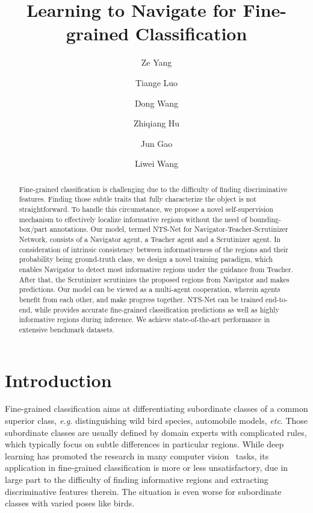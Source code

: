 \documentclass[runningheads]{llncs}
\begin{document}
\title{Learning to Navigate for Fine-grained Classification} 

\author{Ze Yang \and
Tiange Luo \and
Dong Wang \and
Zhiqiang Hu \and
Jun Gao \and
Liwei Wang}

\maketitle              \begin{abstract}
Fine-grained classification is challenging due to the difficulty of finding discriminative features. Finding those subtle traits that fully characterize the object is not straightforward. To handle this circumstance, we propose a novel self-supervision mechanism to effectively localize informative regions without the need of bounding-box/part annotations.  Our model, termed NTS-Net for Navigator-Teacher-Scrutinizer Network, consists of a Navigator agent, a Teacher agent and a Scrutinizer agent. In consideration of intrinsic consistency between informativeness of the regions and their probability being ground-truth class, we design a novel training paradigm,  which enables Navigator to detect most informative regions under the guidance from Teacher. After that, the Scrutinizer scrutinizes the proposed regions from Navigator and makes predictions. Our model can be viewed as a multi-agent cooperation, wherein agents benefit from each other, and make progress together. NTS-Net can be trained end-to-end, while provides accurate fine-grained classification predictions as well as highly informative regions during inference. We achieve state-of-the-art performance in extensive benchmark datasets.
\end{abstract}
\section{Introduction}\label{intro}

Fine-grained classification aims at differentiating subordinate classes of a common superior class, \emph{e.g.} distinguishing wild bird species, automobile models, \emph{etc}.  Those subordinate classes are usually defined by domain experts with complicated rules, which typically focus on subtle differences in particular regions. While deep learning has promoted the research in many computer vision~\cite{Krizhevsky2012ImageNet,ren2015faster,long_shelhamer_fcn} tasks, its application in fine-grained classification is more or less unsatisfactory, due in large part to the difficulty of finding informative regions and extracting discriminative features therein.  The situation is even worse for subordinate classes with varied poses like birds.
\end{document}
